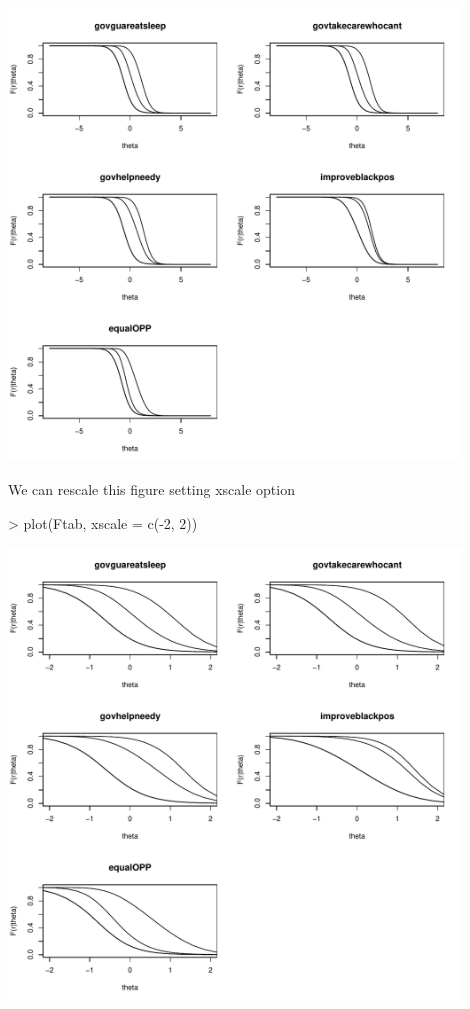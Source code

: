 \documentclass{amsart}
\begin{document}
\begin{center}
{\includegraphics[width=12cm]{./graph/plotStd1.pdf}}
\end{center}

We can rescale this figure setting xscale option

\begin{Schunk}
\begin{Sinput}
> plot(Ftab, xscale = c(-2, 2))
\end{Sinput}
\end{Schunk}

\begin{center}
{\includegraphics[width=12cm]{./graph/plotStd2.pdf}}
\end{center}
\end{document}
